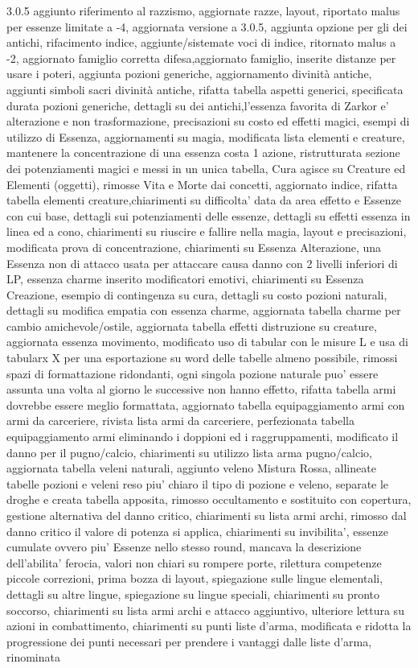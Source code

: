 \documentclass[a4paper,11pt,twoside,openany]{book}
\begin{document}
{    3.0.5 aggiunto riferimento al razzismo, aggiornate razze, layout, riportato malus per essenze limitate a -4, aggiornata versione a 3.0.5, aggiunta opzione per gli dei antichi,  rifacimento indice, aggiunte/sistemate voci di indice, ritornato malus a -2, aggiornato famiglio corretta difesa,aggiornato famiglio, inserite distanze per usare i poteri, aggiunta pozioni generiche, aggiornamento divinità antiche, aggiunti simboli sacri divinità antiche, rifatta tabella aspetti generici, specificata durata pozioni generiche, dettagli su dei antichi,l'essenza favorita di Zarkor e' alterazione e non trasformazione, precisazioni su costo ed effetti magici, esempi di utilizzo di Essenza, aggiornamenti su magia, modificata lista elementi e creature, mantenere la concentrazione di una essenza costa 1 azione, ristrutturata sezione dei potenziamenti magici e messi in un unica tabella, Cura agisce su Creature ed Elementi (oggetti), rimosse Vita e Morte dai concetti, aggiornato indice, rifatta tabella elementi creature,chiarimenti su difficolta' data da area effetto e Essenze con cui base, dettagli sui potenziamenti delle essenze, dettagli su effetti essenza in linea  ed a cono, chiarimenti su riuscire e fallire nella magia, layout e precisazioni, modificata prova di concentrazione, chiarimenti su Essenza Alterazione, una Essenza non di attacco usata per attaccare causa danno con 2 livelli inferiori di LP, essenza charme inserito modificatori emotivi, chiarimenti su Essenza Creazione, esempio di contingenza su cura, dettagli su costo pozioni naturali, dettagli su modifica empatia con essenza charme, aggiornata tabella charme per cambio amichevole/ostile, aggiornata tabella effetti distruzione su creature, aggiornata essenza movimento, modificato uso di tabular con le misure L e usa di tabularx X per una esportazione su word delle tabelle almeno possibile, rimossi spazi di formattazione ridondanti, ogni singola pozione naturale puo' essere assunta una volta al giorno le successive non hanno effetto, rifatta tabella armi dovrebbe essere meglio formattata, aggiornato tabella equipaggiamento armi con armi da carceriere, rivista lista armi da carceriere, perfezionata tabella equipaggiamento armi eliminando i doppioni ed i raggruppamenti, modificato il danno per il pugno/calcio, chiarimenti su utilizzo lista arma pugno/calcio, aggiornata tabella veleni naturali, aggiunto veleno Mistura Rossa, allineate tabelle pozioni e veleni reso piu' chiaro il tipo di pozione e veleno, separate le droghe e creata tabella apposita, rimosso occultamento e sostituito con copertura, gestione alternativa del danno critico, chiarimenti su lista armi archi, rimosso dal danno critico il valore di potenza si applica, chiarimenti su invibilita', essenze cumulate ovvero piu' Essenze nello stesso round, mancava la descrizione dell'abilita' ferocia, valori non chiari su rompere porte, rilettura competenze piccole correzioni, prima bozza di layout, spiegazione sulle lingue elementali, dettagli su altre lingue, spiegazione su lingue speciali, chiarimenti su pronto soccorso, chiarimenti su lista armi archi e attacco aggiuntivo, ulteriore lettura su azioni in combattimento, chiarimenti su punti liste d'arma, modificata e ridotta la progressione dei punti necessari per prendere i vantaggi dalle liste d'arma, rinominata }
\end{document}
